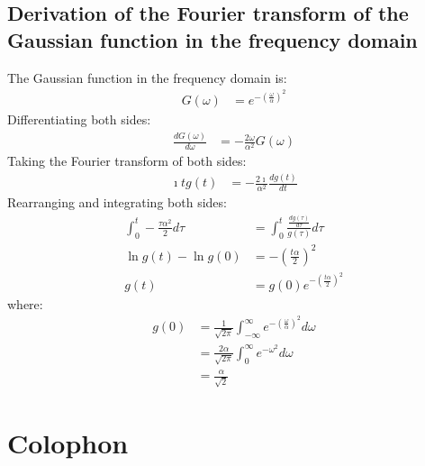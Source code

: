 \documentclass[a4paper,twoside,10pt,english]{report}
\begin{document}
\section{Derivation of the Fourier transform of the Gaussian function in the frequency domain}
The Gaussian function in the frequency domain is:
\begin{align*}
  G\left(\omega\right)&=e^{-\left(\frac{\omega}{\alpha}\right)^{2}}
\end{align*}
Differentiating both sides:
\begin{align*}
  \frac{dG\left(\omega\right)}{d\omega}
  &= -\frac{2\omega}{\alpha^{2}}G\left(\omega\right)
\end{align*}
Taking the Fourier transform of both sides:
\begin{align*}
  \imath{}tg\left(t\right)
  &= -\frac{2\imath}{\alpha^{2}}\frac{dg\left(t\right)}{dt}
\end{align*}
Rearranging and integrating both sides:
\begin{align*}
  \int_{0}^{t}-\frac{\tau\alpha^{2}}{2}d\tau
  &= \int_{0}^{t}\frac{\frac{dg\left(\tau\right)}{d\tau}}
    {g\left(\tau\right)}d\tau \\
  \ln{}g\left(t\right)-\ln{}g\left(0\right)
  &=-\left(\frac{t\alpha}{2}\right)^{2}\\
  g\left(t\right)&=g\left(0\right)e^{-\left(\frac{t\alpha}{2}\right)^{2}}
\end{align*}
where:
\begin{align*}
  g\left(0\right)&= \frac{1}{\sqrt{2\pi}} \int_{-\infty}^{\infty}
                   e^{-\left(\frac{\omega}{\alpha}\right)^{2}}d\omega \\
                 &= \frac{2\alpha}{\sqrt{2\pi}}
                   \int_{0}^{\infty}e^{-\omega^{2}}d\omega \\ 
                 &= \frac{\alpha}{\sqrt{2}}
\end{align*}

\cleardoublepage
\chapter*{\hypertarget{sec:Colophon}{Colophon}}
\end{document}
